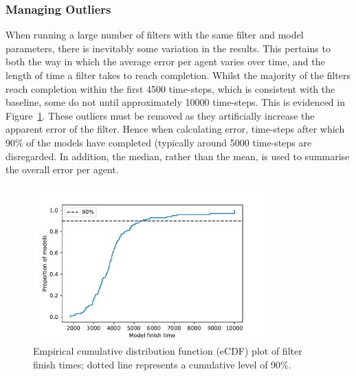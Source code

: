 \documentclass{article}
\begin{document}

\subsubsection*{Managing Outliers}

When running a large number of filters with the same filter and model parameters, there is inevitably some variation in the results. This pertains to both the way in which the average error per agent varies over time, and the length of time a filter takes to reach completion. Whilst the majority of the filters reach completion within the first 4500 time-steps, which is consistent with the baseline, some do not until approximately 10000 time-steps. This is evidenced in Figure~\ref{fig:end_time_cdf}.  These outliers must be removed as they artificially increase the apparent error of the filter. Hence when calculating error, time-steps after which 90\% of the models have completed (typically around 5000 time-steps are disregarded. In addition, the median, rather than the mean, is used to summarise the overall error per agent. 

\begin{figure}[hbt]
	\centering
	\includegraphics[width=0.8\textwidth]{figures/exp2/end_time_cdf.pdf}
	\caption{Empirical cumulative distribution function (eCDF) plot of filter finish times; dotted line represents a cumulative level of 90\%.}\label{fig:end_time_cdf}
\end{figure}
\end{document}

